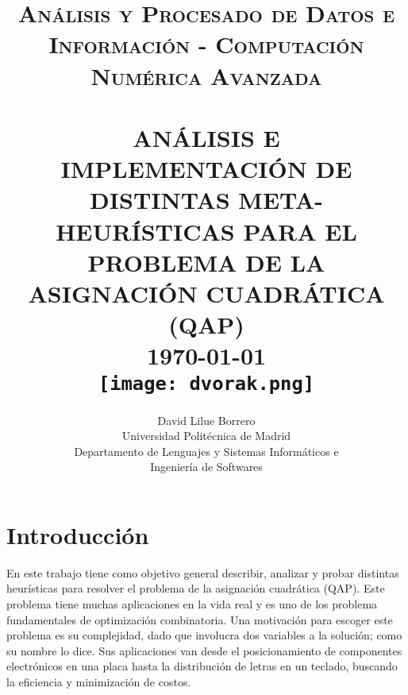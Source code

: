 \usepackage[ddmmyyyy]{datetime}



\title{ \normalsize \textsc{Análisis y Procesado de Datos e Información - Computación Numérica Avanzada}
        \\ [2.0cm]
        \HRule{0.5pt} \\
        \LARGE \textbf{\uppercase{Análisis e implementación de distintas meta-heurísticas para el problema de la asignación cuadrática (QAP)}}
        \HRule{2pt} \\ [0.5cm]
        \normalsize \mydate\today \vspace*{3\baselineskip}\\
        \texttt{[image: dvorak.png]}\vfill}

\date{}

\author{
        David Lilue Borrero \\
        Universidad Politécnica de Madrid \\
        Departamento de Lenguajes y Sistemas Informáticos e\\ Ingeniería de Softwares }

\maketitle
\tableofcontents
\thispagestyle{empty}
\newpage

\sectionfont{\scshape}


\section*{Introducción}

En este trabajo tiene como objetivo general describir, analizar y probar distintas heurísticas para resolver el problema de la asignación cuadrática (QAP). Este problema tiene muchas aplicaciones en la vida real y es uno de los problema fundamentales de optimización combinatoria. Una motivación para escoger este problema es su complejidad, dado que involucra dos variables a la solución; como su nombre lo dice. Sus aplicaciones van desde el posicionamiento de componentes electrónicos en una placa hasta la distribución de letras en un teclado, buscando la eficiencia y minimización de costos. 

